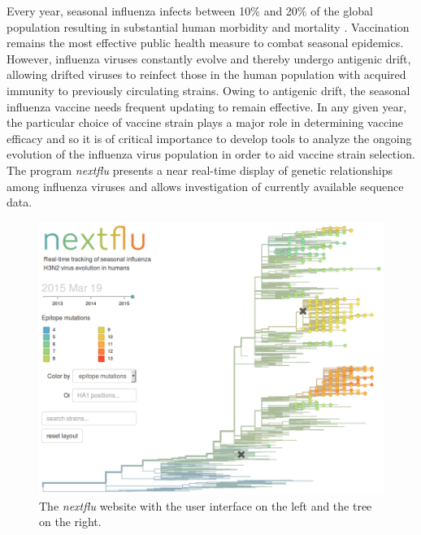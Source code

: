 \documentclass{bioinfo}
\newcommand{\nextflu}{\textit{nextflu}}
\begin{document}

Every year, seasonal influenza infects between 10\% and 20\% of the global population resulting in substantial human morbidity and mortality \citep{flufactsheet}.
Vaccination remains the most effective public health measure to combat seasonal epidemics.
However, influenza viruses constantly evolve and thereby undergo antigenic drift, allowing drifted viruses to reinfect those in the human population with acquired immunity to previously circulating strains.
Owing to antigenic drift, the seasonal influenza vaccine needs frequent updating to remain effective.
In any given year, the particular choice of vaccine strain plays a major role in determining vaccine efficacy and so it is of critical importance to develop tools to analyze the ongoing evolution of the influenza virus population in order to aid vaccine strain selection.
The program \nextflu{} presents a near real-time display of genetic relationships among influenza viruses and allows investigation of currently available sequence data.

\begin{figure}[t!]
	\begin{center}
	\includegraphics[width=0.99\columnwidth]{figures/tree}
\caption[]{The \nextflu{} website with the user interface on the left and
the tree on the right.}
\label{fig:tree}
\end{center}
\end{figure}
\end{document}
